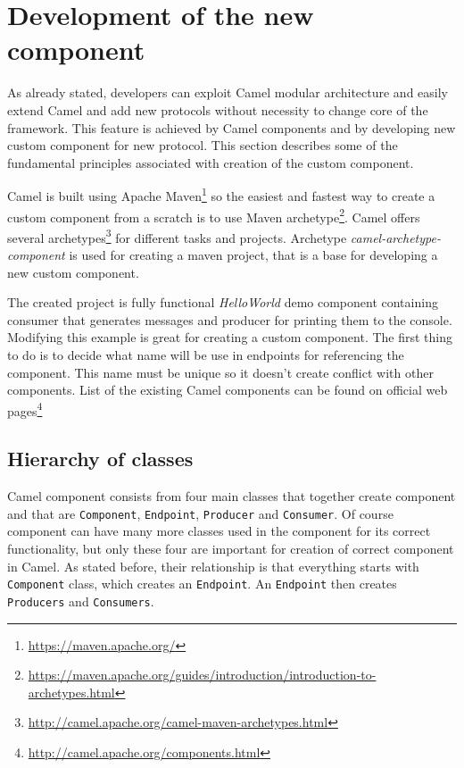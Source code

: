 \documentclass[12pt,final,oneside]{fithesis2}
\begin{document}
 
\section{Development of the new component}\label{component-devel}
As already stated, developers can exploit Camel modular architecture and easily extend Camel and add new protocols without necessity to change core of the framework. This feature is achieved by Camel components and by developing new custom component for new protocol. This section describes some of the fundamental principles associated with creation of the custom component.

Camel is built using Apache Maven\footnote{\url{https://maven.apache.org/}} so the easiest and fastest way to create a custom component from a scratch is to use Maven archetype\footnote{\url{https://maven.apache.org/guides/introduction/introduction-to-archetypes.html}}. Camel offers several archetypes\footnote{\url{http://camel.apache.org/camel-maven-archetypes.html}} for different tasks and projects. Archetype \textit{camel-archetype-component} is used for creating a maven project, that is a base for developing a new custom component\cite{camel-comp}. 

The created project is fully functional \textit{HelloWorld} demo component containing consumer that generates messages and producer for printing them to the console. Modifying this example is great for creating a custom component. The first thing to do is to decide what name will be use in endpoints for referencing the component. This name must be unique so it doesn't create conflict with other components. List of the existing Camel components can be found on official web pages\footnote{\url{http://camel.apache.org/components.html}}

\subsection{Hierarchy of classes}
Camel component consists from four main classes that together create component and that are \texttt{Component}, \texttt{Endpoint}, \texttt{Producer} and \texttt{Consumer}. Of course component can have many more classes used in the component for its correct functionality, but only these four are important for creation of correct component in Camel. As stated before, their relationship is that everything starts with \texttt{Component} class, which creates an \texttt{Endpoint}. An \texttt{Endpoint} then creates \texttt{Producers} and \texttt{Consumers}.
\end{document}
